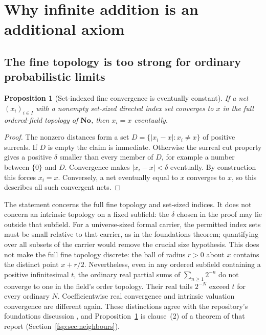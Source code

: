 \documentclass[11pt,a4paper]{article}
\numberwithin{equation}{section}
\newtheorem{proposition}[theorem]{Proposition}
\theoremstyle{definition}
\theoremstyle{remark}
\newcommand{\No}{\mathbf{No}}
\begin{document}
\section{Why infinite addition is an additional axiom}
\label{fsp:sec:infinity}

\subsection{The fine topology is too strong for ordinary probabilistic limits}

\begin{proposition}[Set-indexed fine convergence is eventually constant]
\label{fsp:prop:fine}
If a net $(x_i)_{i\in I}$ with a nonempty set-sized directed index set
converges to $x$ in
the full ordered-field topology of $\No$, then $x_i=x$ eventually.
\end{proposition}
\begin{proof}
The nonzero distances form a set
$D=\{|x_i-x|:x_i\ne x\}$ of positive surreals. If $D$ is empty the
claim is immediate. Otherwise the surreal cut property gives a positive
$\delta$ smaller than every member of $D$, for example a number between
$\{0\}$ and $D$. Convergence makes $|x_i-x|<\delta$ eventually. By
construction this forces $x_i=x$. Conversely, a net eventually equal to
$x$ converges to $x$, so this describes all such convergent nets.
\end{proof}

The statement concerns the full fine topology and set-sized indices.
It does not concern an intrinsic topology on a fixed subfield: the
$\delta$ chosen in the proof may lie outside that subfield. For a
universe-sized formal carrier, the permitted index sets must be small
relative to that carrier, as in the foundations theorem; quantifying over
all subsets of the carrier would remove the crucial size hypothesis.
This does not make the full fine topology discrete: the ball of radius
$r>0$ about $x$ contains the distinct point $x+r/2$. Nevertheless,
even in any ordered subfield containing a positive infinitesimal $t$,
the ordinary real partial sums of $\sum_{n\ge1}2^{-n}$ do not converge
to one in the field's order topology. Their real tails $2^{-N}$ exceed
$t$ for every ordinary $N$. Coefficientwise real convergence and intrinsic
valuation convergence are different again. These distinctions agree with
the repository's foundations discussion \cite{repofound}, and
Proposition~\ref{fsp:prop:fine} is clause~(2) of a theorem of that report
(Section~\ref{fsp:sec:neighbours}).
\end{document}
